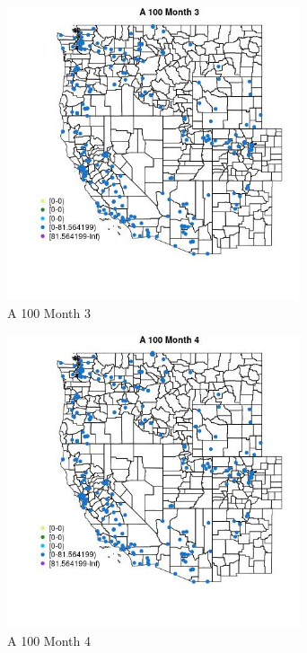 \begin{figure} 
\centering  
\includegraphics[width=0.77\textwidth]{Code_Outputs/Report_ML_input_PM25_Step4_part_e_de_duplicated_aveswNAs_MapObsMo3A_100.jpg} 
\caption{\label{fig:Report_ML_input_PM25_Step4_part_e_de_duplicated_aveswNAsMapObsMo3A_100}A 100 Month 3} 
\end{figure} 
 

\begin{figure} 
\centering  
\includegraphics[width=0.77\textwidth]{Code_Outputs/Report_ML_input_PM25_Step4_part_e_de_duplicated_aveswNAs_MapObsMo4A_100.jpg} 
\caption{\label{fig:Report_ML_input_PM25_Step4_part_e_de_duplicated_aveswNAsMapObsMo4A_100}A 100 Month 4} 
\end{figure} 
 

